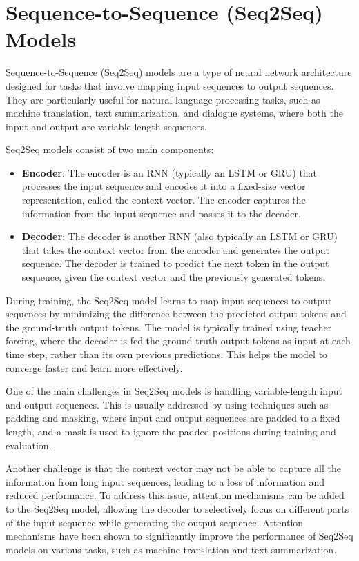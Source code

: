 \documentclass[12pt]{article}
\begin{document}
\section{Sequence-to-Sequence (Seq2Seq) Models}

Sequence-to-Sequence (Seq2Seq) models are a type of neural network architecture designed for tasks that involve mapping input sequences to output sequences. They are particularly useful for natural language processing tasks, such as machine translation, text summarization, and dialogue systems, where both the input and output are variable-length sequences.

Seq2Seq models consist of two main components:

\begin{itemize}
\item \textbf{Encoder}: The encoder is an RNN (typically an LSTM or GRU) that processes the input sequence and encodes it into a fixed-size vector representation, called the context vector. The encoder captures the information from the input sequence and passes it to the decoder.

\item \textbf{Decoder}: The decoder is another RNN (also typically an LSTM or GRU) that takes the context vector from the encoder and generates the output sequence. The decoder is trained to predict the next token in the output sequence, given the context vector and the previously generated tokens.
\end{itemize}
During training, the Seq2Seq model learns to map input sequences to output sequences by minimizing the difference between the predicted output tokens and the ground-truth output tokens. The model is typically trained using teacher forcing, where the decoder is fed the ground-truth output tokens as input at each time step, rather than its own previous predictions. This helps the model to converge faster and learn more effectively.

One of the main challenges in Seq2Seq models is handling variable-length input and output sequences. This is usually addressed by using techniques such as padding and masking, where input and output sequences are padded to a fixed length, and a mask is used to ignore the padded positions during training and evaluation.

Another challenge is that the context vector may not be able to capture all the information from long input sequences, leading to a loss of information and reduced performance. To address this issue, attention mechanisms can be added to the Seq2Seq model, allowing the decoder to selectively focus on different parts of the input sequence while generating the output sequence. Attention mechanisms have been shown to significantly improve the performance of Seq2Seq models on various tasks, such as machine translation and text summarization.
\end{document}
